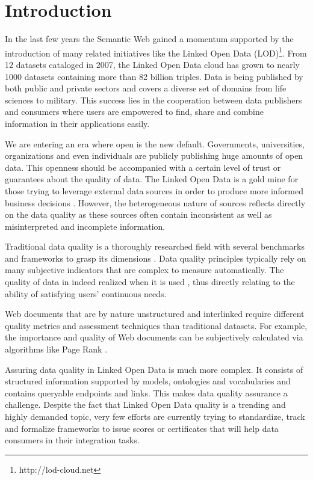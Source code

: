 \documentclass[onecolumn, crcready]{iosart2c}
\begin{document}
\section{Introduction}
In the last few years the Semantic Web gained a momentum supported by the introduction of many related initiatives like the Linked Open Data (LOD)\footnote{http://lod-cloud.net}. From 12 datasets cataloged in 2007, the Linked Open Data cloud has grown to nearly 1000 datasets containing more than 82 billion triples. Data is being published by both public and private sectors and covers a diverse set of domains from life sciences to military. This success lies in the cooperation between data publishers and consumers where users are empowered to find, share and combine information in their applications easily.

We are entering an era where open is the new default. Governments, universities, organizations and even individuals are publicly publishing huge amounts of open data. This openness should be accompanied with a certain level of trust or guarantees about the quality of data. The Linked Open Data is a gold mine for those trying to leverage external data sources in order to produce more informed business decisions \cite{Boyd2011}. However, the heterogeneous nature of sources reflects directly on the data quality as these sources often contain inconsistent as well as misinterpreted and incomplete information.

Traditional data quality is a thoroughly researched field with several benchmarks and frameworks to grasp its dimensions \cite{Kahn2002}\cite{Stvilia2007}\cite{Wang1996}. Data quality principles typically rely on many subjective indicators that are complex to measure automatically. The quality of data in indeed realized when it is used \cite{juran-j-1999-quality}, thus directly relating to the ability of satisfying users' continuous needs.

Web documents that are by nature unstructured and interlinked require different quality metrics and assessment techniques than traditional datasets. For example, the importance and quality of Web documents can be subjectively calculated via algorithms like Page Rank \cite{ Lawrence981}.

Assuring data quality in Linked Open Data is much more complex. It consists of structured information supported by models, ontologies and vocabularies and contains queryable endpoints and links. This makes data quality assurance a challenge. Despite the fact that Linked Open Data quality is a trending and highly demanded topic, very few efforts are currently trying to standardize, track and formalize frameworks to issue scores or certificates that will help data consumers in their integration tasks.\\
\end{document}
